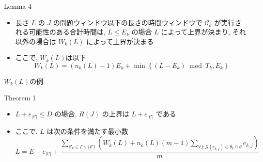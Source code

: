 \begin{frame}[label=lemma4]{Lemma 4}
    \begin{lemma}[]
        \setlength{\linewidth}{0.98\columnwidth}
        \begin{itemize}
            \item 長さ $L$ の $J$ の問題ウィンドウ以下の長さの時間ウィンドウで $\mathcal{C}_{k}$ が実行される可能性のある合計時間は, $L \leq E_{k}$ の場合 $L$ によって上界が決まり, それ以外の場合は $W_{k}(L)$ によって上界が決まる
            \item ここで, $W_{k}(L)$は以下
                  \begin{equation*}
                      W_{k}(L)=\left(n_{k}(L)-1\right) E_{k}+\min \left\{\left(L-E_{k}\right) \bmod T_{k}, E_{k}\right\}
                  \end{equation*}
        \end{itemize}
    \end{lemma}
\end{frame}


\begin{frame}{$W_{k}(L)$の例}
\end{frame}

\begin{frame}[label=theorem1]{Theorem 1}
    \begin{theorem}[]
        \setlength{\linewidth}{0.98\columnwidth}
        \begin{itemize}
            \item $L+e_{|\mathcal{C}|} \leq D$ の場合, $R(J)$ の上界は $L+e_{|\mathcal{C}|}$ である
            \item ここで, $L$ は次の条件を満たす最小数
                  \begin{equation*}
                      L=E-e_{|\mathcal{C}|}+\frac{\sum_{\mathcal{C}_{k} \in \Gamma \backslash\{\mathcal{C}\}}\left(W_{k}(L)+n_{k}(L)(m-1) \sum_{\forall j: \mathcal{G}\left(c_{k, j}\right) \in \theta_{k} \cap \theta} e_{k, j}\right)}{m}
                  \end{equation*}
        \end{itemize}
    \end{theorem}
\end{frame}


